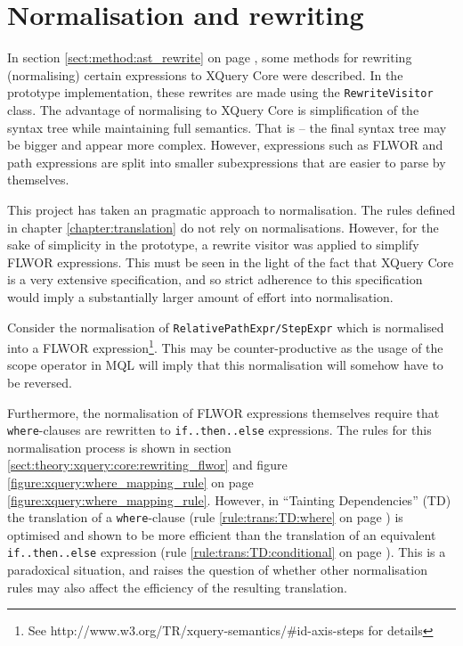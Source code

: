 \section{Normalisation and rewriting}
\label{sect:disc:rewriting}
In section \ref{sect:method:ast_rewrite} on page
\pageref{sect:method:ast_rewrite}, some methods for rewriting (normalising)
certain expressions to XQuery Core were described. In the prototype implementation,
these rewrites are made using the \texttt{RewriteVisitor} class. The advantage
of normalising to XQuery Core is simplification of the syntax tree while
maintaining full semantics. That is -- the final syntax tree may be bigger and
appear more complex. However, expressions such as FLWOR and path expressions
are split into smaller subexpressions that are easier to parse by themselves. 

This project has taken an pragmatic approach to normalisation. The rules
defined in chapter \ref{chapter:translation} do not rely on normalisations.
However, for the sake of simplicity in the prototype, a rewrite visitor was 
applied to simplify FLWOR expressions. This must be seen in the light of the
fact that XQuery Core is a very extensive specification\cite{xquery_semantics},
and so strict adherence to this specification would imply a substantially
larger amount of effort into normalisation.

Consider the normalisation of \texttt{RelativePathExpr/StepExpr} which is normalised
into a FLWOR expression\footnote{See
http://www.w3.org/TR/xquery-semantics/\#id-axis-steps for details}. This may be
counter-productive as the usage of the \textsf{scope} operator in MQL will
imply that this normalisation will somehow have to be reversed.

Furthermore, the normalisation of FLWOR expressions themselves require that
\texttt{where}-clauses are rewritten to \texttt{if..then..else} expressions. The rules for this
normalisation process is shown in section
\ref{sect:theory:xquery:core:rewriting_flwor} and figure
\ref{figure:xquery:where_mapping_rule} on page 
\ref{figure:xquery:where_mapping_rule}. However, in ``Tainting Dependencies''
(TD) the translation of a \texttt{where}-clause (rule \ref{rule:trans:TD:where} on page
\pageref{rule:trans:TD:where}) is optimised and shown to be more efficient than
the translation of an equivalent \texttt{if..then..else} expression (rule
\ref{rule:trans:TD:conditional} on page \pageref{rule:trans:TD:conditional}).
This is a paradoxical situation, and raises the question of whether other
normalisation rules may also affect the efficiency of the resulting
translation.

